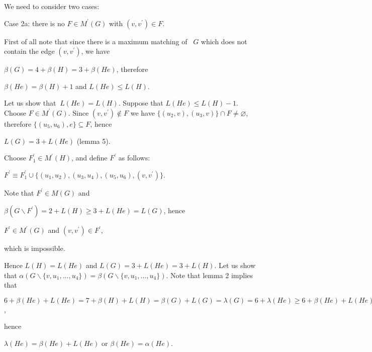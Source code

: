 \documentclass{article}
\begin{document}
We need to consider two cases:

Case 2a: there is no $F\in M^{\prime }(G)$ with $(v,v^{\prime })\in F$.

First of all note that since there is a maximum matching of \ $G$ which does
not contain the edge $(v,v^{\prime })$, we have

\begin{center}
$\beta (G)=4+\beta (H)=3+\beta (He)$, therefore

$\beta (He)=\beta (H)+1$ and $L(He)\leq L(H)$.
\end{center}

Let us show that $\ L(He)=L(H)$. Suppose that $L(He)\leq L(H)-1$. Choose $F\in M^{\prime }(G)$. Since $(v,v^{\prime })\notin F$ we have $\{(u_{2},v),(u_{3},v)\}\cap F\neq \varnothing $, therefore $\{(u_{5},u_{6}),e\}\subseteq F$, hence

\begin{center}
$L(G)=3+L(He)$ (lemma 5).
\end{center}

Choose $F_{1}^{\prime }\in M^{\prime }(H)$, and define $F^{\prime }$ as
follows:

\begin{center}
$F^{\prime }\equiv F_{1}^{\prime }\cup
\{(u_{1},u_{2}),(u_{3},u_{4}),(u_{5},u_{6}),(v,v^{\prime })\}$.
\end{center}

Note that $F^{\prime }\in M(G)$ and

\begin{center}
$\beta (G\backslash F^{\prime })=2+L(H)\geq 3+L(He)=L(G)$, hence

$F^{\prime }\in M^{\prime }(G)$ and $(v,v^{\prime })\in F^{\prime }$,
\end{center}

which is impossible.

Hence $L(H)=L(He)$ and $L(G)=3+L(He)=3+L(H)$. Let us show that $\alpha
(G\backslash \{v,u_{1},...,u_{4}\})=\beta (G\backslash
\{v,u_{1},...,u_{4}\}) $. Note that lemma 2 implies that

\begin{center}
$6+\beta (He)+L(He)=7+\beta (H)+L(H)=\beta (G)+L(G)=\lambda (G)=6+\lambda
(He)\geq 6+\beta (He)+L(He)$,
\end{center}

hence

\begin{center}
$\lambda (He)=\beta (He)+L(He)$ or $\beta (He)=\alpha (He)$.
\end{center}
\end{document}
